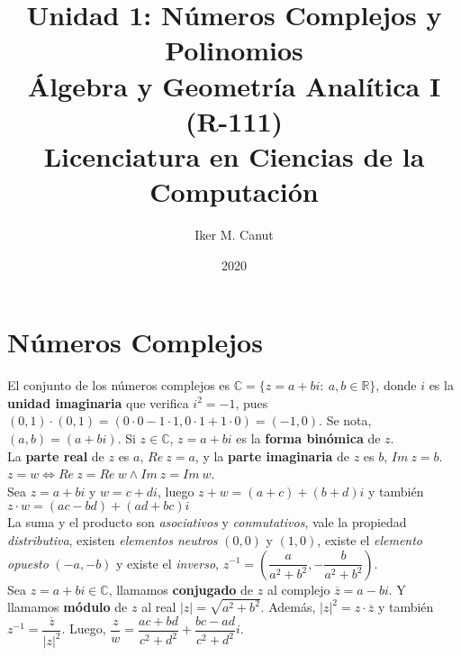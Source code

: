 \documentclass[11pt,a4paper]{article}
\author{Iker M. Canut}
\title{Unidad 1: N\'umeros Complejos y Polinomios\\ \'Algebra y Geometr\'ia Anal\'itica I (R-111)\\Licenciatura en Ciencias de la Computaci\'on}
\date{2020}
\begin{document}
\maketitle
\newpage
\section{N\'umeros Complejos}
\noindent El conjunto de los n\'umeros complejos es $\mathbb{C} = \{ z = a+bi:\ a,b \in \mathbb{R}\}$, donde $i$ es la \textbf{unidad imaginaria} que verifica $i^2 = -1$, pues $(0,1)\cdot(0,1)=(0\cdot0-1\cdot1,0\cdot1+1\cdot0) = (-1,0)$. Se nota, $(a,b) = (a+bi)$. Si $z\in\mathbb{C}$, $z=a+bi$ es la \textbf{forma bin\'omica} de $z$.\\

\noindent La \textbf{parte real} de $z$ es $a$, $Re\ z = a$, y la \textbf{parte imaginaria} de $z$ es $b$, $Im\ z = b$.\\
$z = w \iff Re\ z = Re\ w \land Im\ z = Im\ w$.\\

\noindent Sea $z=a+bi$ y $w=c+di$, luego $z+w = (a+c)+(b+d)i$ y tambi\'en $z \cdot w = (ac-bd)+(ad+bc)i$\\
\noindent La suma y el producto son \textit{asociativos} y \textit{conmutativos}, vale la propiedad \textit{distributiva}, existen \textit{elementos neutros} $(0,0)$ y $(1,0)$, existe el \textit{elemento opuesto} $(-a,-b)$ y existe el \textit{inverso}, $z^{-1} = (\dfrac{a}{a^2+b^2}, -\dfrac{b}{a^2+b^2})$.\\

\noindent Sea $z=a+bi \in \mathbb{C}$, llamamos \textbf{conjugado} de $z$ al complejo $\overline{z}=a-bi$. Y llamamos \textbf{m\'odulo} de $z$ al real $|z| = \sqrt{a^2+b^2}$. Adem\'as, $|z|^2 = z\cdot\overline{z}$ y tambi\'en $z^{-1} = \dfrac{\overline{z}}{|z|^2}$. Luego, $\dfrac{z}{w} = \dfrac{ac+bd}{c^2+d^2} + \dfrac{bc-ad}{c^2+d^2}i$.
\end{document}
